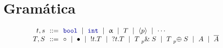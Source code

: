\section{Gramática}

\[
\begin{array}{@{}r@{~~}c@{~~}l@{}}
\TypeT, \TypeS & ::= &
\tbool
\rulemid \tint
\rulemid \tvar
\rulemid \SessionType
\rulemid \ClosedSessionType
\rulemid \cdots
\\
\SessionTypeT, \SessionTypeS & ::= &
\tend
\rulemid \tdone
\rulemid \cout\Type\SessionType
\rulemid \cin\Type\SessionType
\rulemid \tbranch[p]\SessionTypeT\SessionTypeS
\rulemid \tchoice[p]\SessionTypeT\SessionTypeS
\rulemid \etvar
\rulemid \dual\etvar
\end{array}
\]

